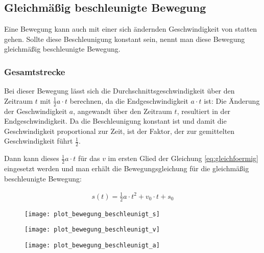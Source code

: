\subsection{Gleichmäßig beschleunigte Bewegung}
Eine Bewegung kann auch mit einer sich ändernden Geschwindigkeit von statten gehen. Sollte diese Beschleunigung konstant sein, nennt man diese Bewegung gleichmäßig beschleunigte Bewegung.

\subsubsection{Gesamtstrecke}

Bei dieser Bewegung lässt sich die Durchschnittsgeschwindigkeit über den Zeitraum $t$ mit $\frac{1}{2}a \cdot t$ berechnen, da die Endgeschwindigkeit $a \cdot t$ ist: Die Änderung der Geschwindigkeit $a$, angewandt über den Zeitraum $t$, resultiert in der Endgeschwindigkeit. Da die Beschleunigung konstant ist und damit die Geschwindigkeit proportional zur Zeit, ist der Faktor, der zur gemittelten Geschwindigkeit führt $\frac{1}{2}$.

Dann kann dieses $\frac{1}{2}a \cdot t$ für das $v$ im ersten Glied der Gleichung \ref{eq:gleichfoermig} eingesetzt werden und man erhält die Bewegungsgleichung für die gleichmäßig beschleunigte Bewegung:

\begin{align} \label{eq:streckegleichmaessig}
	s(t) = \frac{1}{2}a \cdot t^2 + v_0 \cdot t + s_0
\end{align}

\begin{figure}[h!]
	\centering
	\begin{minipage}[b]{0.3\linewidth}
		\begin{comment} Gnuplot:
set xlabel "t"
set ylabel "s(t)"
set output "plot_bewegung_beschleunigt_s.png"
plot 0.5 * 1 * x * x ls 1
		\end{comment}
    	\texttt{[image: plot\_bewegung\_beschleunigt\_s]}
	\end{minipage}
	\quad
	\begin{minipage}[b]{0.3\linewidth}
		\begin{comment} Gnuplot:
set xlabel "t"
set ylabel "v(t)"
set output "plot_bewegung_beschleunigt_v.png"
plot x ls 1
		\end{comment}
    	\texttt{[image: plot\_bewegung\_beschleunigt\_v]}
	\end{minipage}
	\quad
	\begin{minipage}[b]{0.3\linewidth}
		\begin{comment} Gnuplot:
set xlabel "t"
set ylabel "a(t)"
set output "plot_bewegung_beschleunigt_a.png"
plot 1 ls 1
		\end{comment}
    	\texttt{[image: plot\_bewegung\_beschleunigt\_a]}
	\end{minipage}
\end{figure}


